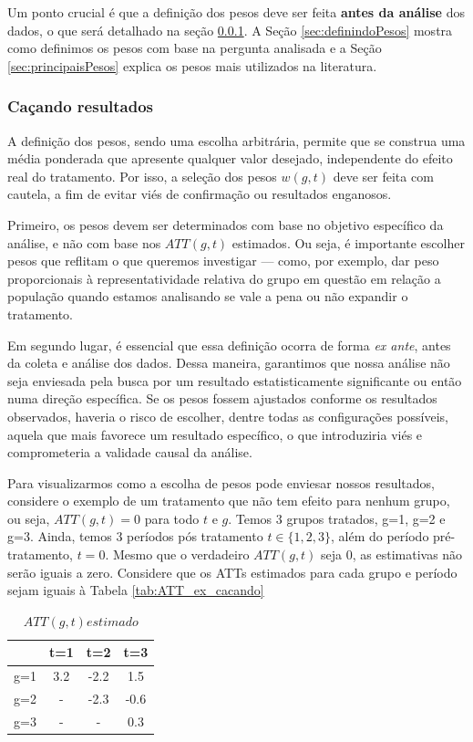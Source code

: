 \documentclass[portugues]{article}
\begin{document}
Um ponto crucial é que a definição dos pesos deve ser feita \textbf{antes da análise} dos dados, o que será detalhado na seção \ref{sec:resultadosespúrios}. A Seção \ref{sec:definindoPesos} mostra como definimos os pesos com base na pergunta analisada e a Seção \ref{sec:principaisPesos} explica os pesos mais utilizados na literatura.  

\subsubsection{Caçando resultados} \label{sec:resultadosespúrios}

A definição dos pesos, sendo uma escolha arbitrária, permite que se construa uma média ponderada que apresente qualquer valor desejado, independente do efeito real do tratamento. Por isso, a seleção dos pesos $w(g,t)$ deve ser feita com cautela, a fim de evitar viés de confirmação ou resultados enganosos.

Primeiro, os pesos devem ser determinados com base no objetivo específico da análise, e não com base nos $ATT(g,t)$ estimados. Ou seja, é importante escolher pesos que reflitam o que queremos investigar — como, por exemplo, dar peso proporcionais à representatividade relativa do grupo em questão em relação a população quando estamos analisando se vale a pena ou não expandir o tratamento.

Em segundo lugar, é essencial que essa definição ocorra de forma \textit{ex ante}, antes da coleta e análise dos dados. Dessa maneira, garantimos que nossa análise não seja enviesada pela busca por um resultado estatisticamente significante ou então numa direção específica. Se os pesos fossem ajustados conforme os resultados observados, haveria o risco de escolher, dentre todas as configurações possíveis, aquela que mais favorece um resultado específico, o que introduziria viés e comprometeria a validade causal da análise.

Para visualizarmos como a escolha de pesos pode enviesar nossos resultados, considere o exemplo de um tratamento que não tem efeito para nenhum grupo, ou seja, $ATT(g,t) = 0$ para todo $t$ e $g$. Temos 3 grupos tratados, g=1, g=2 e g=3. Ainda, temos 3 períodos pós tratamento $t \in \{1,2,3\}$, além do período pré-tratamento, $t=0$. Mesmo que o verdadeiro $ATT(g,t)$ seja 0, as estimativas não serão iguais a zero. Considere que os ATTs estimados para cada grupo e período sejam iguais à Tabela \ref{tab:ATT_ex_cacando}

\begin{table}[!htp]
    \centering
    \caption{$ATT(g,t) estimado$} \label{tab:ATT_ex_cacando}
    \begin{tabular}{c|c c c}
            & t=1   &    t=2    & t=3 \\
            \hline \hline
        g=1 &  3.2  &   -2.2    & 1.5 \\
        g=2 &  -    &   -2.3    & -0.6 \\
        g=3 &  -    &   -       & 0.3  \\
        \hline
    \end{tabular}
    \label{tab:ATT_gt}
\end{table}
\end{document}
